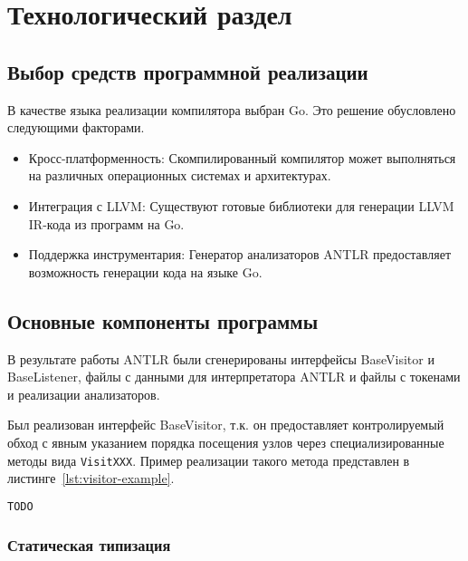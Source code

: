 \section{Технологический раздел}

\subsection{Выбор средств программной реализации}

В качестве языка реализации компилятора выбран Go. Это решение обусловлено следующими факторами.

\begin{itemize}
    \item Кросс-платформенность: Скомпилированный компилятор может выполняться на различных операционных системах и архитектурах.
    
    \item Интеграция с LLVM: Существуют готовые библиотеки для генерации LLVM IR-кода из программ на Go.
    
    \item Поддержка инструментария: Генератор анализаторов ANTLR предоставляет возможность генерации кода на языке Go.
\end{itemize}

\subsection{Основные компоненты программы}

В результате работы ANTLR были сгенерированы интерфейсы BaseVisitor и BaseListener, файлы с данными для интерпретатора ANTLR и файлы с токенами и реализации анализаторов.

Был реализован интерфейс BaseVisitor, т.к. он предоставляет контролируемый обход с явным указанием порядка посещения узлов через специализированные методы вида \texttt{VisitXXX}. Пример реализации такого метода представлен в листинге~\ref{lst:visitor-example}.

\begin{lstlisting}[language=go, caption={Пример реализации метода BaseVisitor}, label=lst:visitor-example]
TODO
\end{lstlisting}

\subsubsection*{Статическая типизация}

